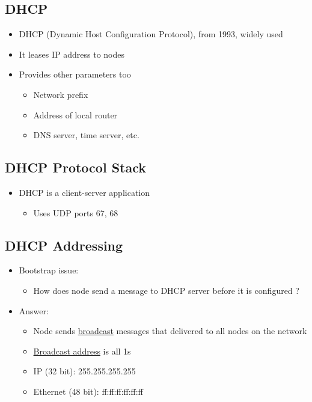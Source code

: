 \documentclass[12pt]{ctexart}   %
\begin{document}
	\subsection{DHCP}
	\begin{itemize}
		\item DHCP (Dynamic Host Configuration Protocol), from 1993, widely used
		\item It leases IP address to nodes
		\item Provides other parameters too
		\begin{itemize}
			\item Network prefix
			\item Address of local router
			\item DNS server, time server, etc.
		\end{itemize}
	\end{itemize}
	
	\subsection{DHCP Protocol Stack}
	\begin{itemize}
		\item DHCP is a client-server application
		\begin{itemize}
			\item Uses UDP ports 67, 68
		\end{itemize}
	\end{itemize}
	
	\subsection{DHCP Addressing}
	\begin{itemize}
		\item Bootstrap issue:
		\begin{itemize}
			\item How does node send a message to DHCP server before it is configured ?
		\end{itemize}
		
		\item Answer:
		\begin{itemize}
			\item Node sends \underline{broadcast} messages that delivered to all nodes on the network
			\item \underline{Broadcast address} is all 1s
			\item IP (32 bit): 255.255.255.255
			\item Ethernet (48 bit): ff:ff:ff:ff:ff:ff
		\end{itemize}
	\end{itemize}
	
\end{document}
